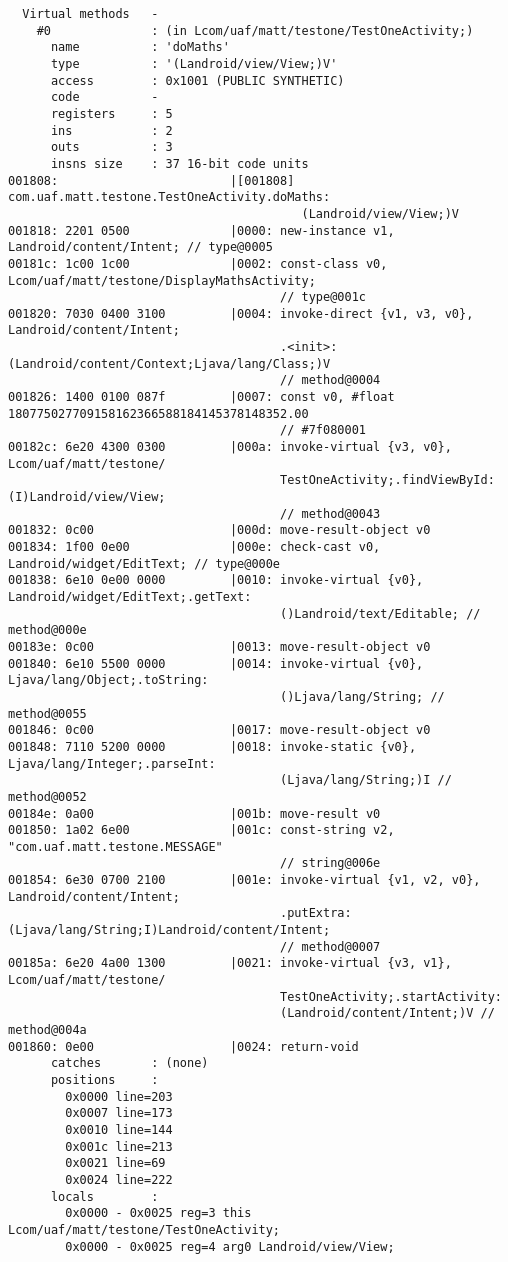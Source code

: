 \begin{lstlisting}
  Virtual methods   -
    #0              : (in Lcom/uaf/matt/testone/TestOneActivity;)
      name          : 'doMaths'
      type          : '(Landroid/view/View;)V'
      access        : 0x1001 (PUBLIC SYNTHETIC)
      code          -
      registers     : 5
      ins           : 2
      outs          : 3
      insns size    : 37 16-bit code units
001808:                        |[001808] com.uaf.matt.testone.TestOneActivity.doMaths:
                                         (Landroid/view/View;)V
001818: 2201 0500              |0000: new-instance v1, Landroid/content/Intent; // type@0005
00181c: 1c00 1c00              |0002: const-class v0, Lcom/uaf/matt/testone/DisplayMathsActivity;
                                      // type@001c
001820: 7030 0400 3100         |0004: invoke-direct {v1, v3, v0}, Landroid/content/Intent;
                                      .<init>:(Landroid/content/Context;Ljava/lang/Class;)V
                                      // method@0004
001826: 1400 0100 087f         |0007: const v0, #float 180775027709158162366588184145378148352.00
                                      // #7f080001
00182c: 6e20 4300 0300         |000a: invoke-virtual {v3, v0}, Lcom/uaf/matt/testone/
                                      TestOneActivity;.findViewById:(I)Landroid/view/View;
                                      // method@0043
001832: 0c00                   |000d: move-result-object v0
001834: 1f00 0e00              |000e: check-cast v0, Landroid/widget/EditText; // type@000e
001838: 6e10 0e00 0000         |0010: invoke-virtual {v0}, Landroid/widget/EditText;.getText:
                                      ()Landroid/text/Editable; // method@000e
00183e: 0c00                   |0013: move-result-object v0
001840: 6e10 5500 0000         |0014: invoke-virtual {v0}, Ljava/lang/Object;.toString:
                                      ()Ljava/lang/String; // method@0055
001846: 0c00                   |0017: move-result-object v0
001848: 7110 5200 0000         |0018: invoke-static {v0}, Ljava/lang/Integer;.parseInt:
                                      (Ljava/lang/String;)I // method@0052
00184e: 0a00                   |001b: move-result v0
001850: 1a02 6e00              |001c: const-string v2, "com.uaf.matt.testone.MESSAGE"
                                      // string@006e
001854: 6e30 0700 2100         |001e: invoke-virtual {v1, v2, v0}, Landroid/content/Intent;
                                      .putExtra:(Ljava/lang/String;I)Landroid/content/Intent;
                                      // method@0007
00185a: 6e20 4a00 1300         |0021: invoke-virtual {v3, v1}, Lcom/uaf/matt/testone/
                                      TestOneActivity;.startActivity:
                                      (Landroid/content/Intent;)V // method@004a
001860: 0e00                   |0024: return-void
      catches       : (none)
      positions     :
        0x0000 line=203
        0x0007 line=173
        0x0010 line=144
        0x001c line=213
        0x0021 line=69
        0x0024 line=222
      locals        :
        0x0000 - 0x0025 reg=3 this Lcom/uaf/matt/testone/TestOneActivity;
        0x0000 - 0x0025 reg=4 arg0 Landroid/view/View;


\end{lstlisting}

